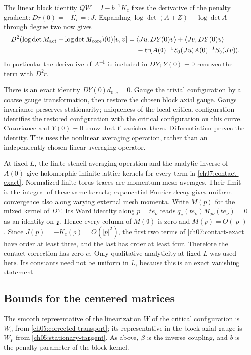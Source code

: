 The linear block identity $QW=I-b^{-1}K_c$ fixes the derivative of the
penalty gradient:
$Dr(0)=-K_c=:J$. Expanding $\log\det(A+Z)-\log\det A$ through degree two
now gives
\begin{align}\label{ch07:contact-exact}
 D^2(\log\det M_{\rm act}-\log\det M_{\rm core})(0)[u,v]
 ={}&\langle Ju,DY(0)v\rangle+\langle Jv,DY(0)u\rangle\\
 &-\operatorname{tr}(A(0)^{-1}S_0(Ju)A(0)^{-1}S_0(Jv)).\notag
\end{align}
In particular the derivative of $A^{-1}$ is included in $DY$;
$Y(0)=0$ removes the term with $D^2r$.

There is an exact identity $DY(0)d_{0,c}=0$. Gauge the trivial
configuration by a coarse gauge transformation, then restore the chosen
block axial gauge. Gauge invariance preserves stationarity; uniqueness of the
local critical configuration identifies the restored configuration with the
critical configuration on this curve. Covariance and $Y(0)=0$ show that $Y$
vanishes there. Differentiation proves the identity. This uses the nonlinear
averaging operation, rather than an independently chosen linear averaging operator.

At fixed $L$, the finite-stencil averaging operation and the analytic inverse of
$A(0)$ give holomorphic infinite-lattice kernels for every term in
\eqref{ch07:contact-exact}. Normalized finite-torus traces are momentum
mesh averages. Their limit is the integral of these same kernels;
exponential Fourier decay gives uniform convergence also along varying
external mesh momenta. Write $M(p)$ for the mixed kernel of $DY$.
Its Ward identity along $p=te_\nu$ reads
$q_\nu(te_\nu)M_{j\nu}(te_\nu)=0$ as an identity on $\mathfrak g$.
Hence every column of $M(0)$ is zero and $M(p)=O(|p|)$.
Since $J(p)=-K_c(p)=O(|p|^2)$, the first two terms of
\eqref{ch07:contact-exact} have order at least three, and the last has
order at least four. Therefore the contact correction has zero $\alpha$.
Only qualitative analyticity at fixed $L$ was used here. Its constants
need not be uniform in $L$, because this is an exact vanishing statement.

\subsection{Bounds for the centered matrices}\label{ch07:weighted}

The smooth representative of the linearization $W$ of the critical configuration is $W_a$ from \eqref{ch05:corrected-transport}; its representative in the block axial gauge is $W_F$ from \eqref{ch05:stationary-tangent}. As above, $\beta$ is the inverse coupling, and $b$ is the penalty parameter of the block kernel.

